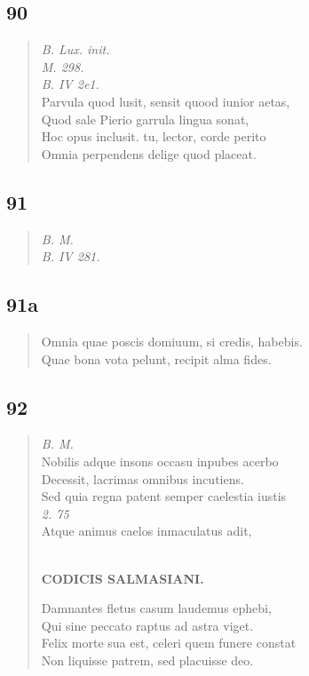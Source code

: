 \documentclass[11pt, a4paper]{report}
\begin{document}
            \subsection*{90}
      \begin{verse}
      \textit{B. Lux. init.} \\ \textit{M. 298.} \\ \textit{B. IV 2e1.} \\ Parvula quod lusit, sensit quood iunior aetas, \\ Quod sale Pierio garrula lingua sonat, \\ Hoc opus inclusit. tu, lector, corde perito \\ Omnia perpendens delige quod placeat. \\ 
      \end{verse}
  
            \subsection*{91}
      \begin{verse}
      \textit{B. M.} \\ \textit{B. IV 281.} \\ 
      \end{verse}
  
            \subsection*{91a}
      \begin{verse}
      Omnia quae poscis domiuum, si credis, habebis. \\ Quae bona vota pelunt, recipit alma fides. \\ 
      \end{verse}
  
            \subsection*{92}
      \begin{verse}
      \textit{B. M.} \\ Nobilis adque insons occasu inpubes acerbo \\ Decessit, lacrimas omnibus incutiens. \\ Sed quia regna patent semper caelestia iustis \\ \textit{2. 75} \\ Atque animus caelos inmaculatus adit, \\ 
        ﻿\pagebreak 
    \begin{center} \textbf{CODICIS SALMASIANI.} \end{center} \marginpar{[123]} Damnantes fletus casum laudemus ephebi, \\ Qui sine peccato raptus ad astra viget. \\ Felix morte sua est, celeri quem funere constat \\ Non liquisse patrem, sed placuisse deo. \\ 
      \end{verse}
  
\end{document}
